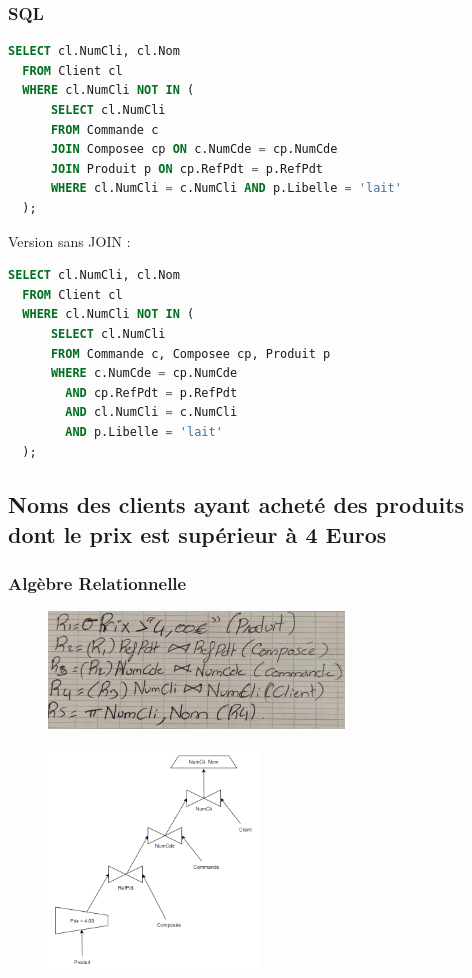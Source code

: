\documentclass{article}
\begin{document}
\subsubsection{SQL}

\begin{lstlisting}[language=SQL]
  SELECT cl.NumCli, cl.Nom 
  FROM Client cl
  WHERE cl.NumCli NOT IN (
      SELECT cl.NumCli
      FROM Commande c
      JOIN Composee cp ON c.NumCde = cp.NumCde
      JOIN Produit p ON cp.RefPdt = p.RefPdt
      WHERE cl.NumCli = c.NumCli AND p.Libelle = 'lait'
  );
\end{lstlisting}

Version sans JOIN :

\begin{lstlisting}[language=SQL]
  SELECT cl.NumCli, cl.Nom 
  FROM Client cl
  WHERE cl.NumCli NOT IN (
      SELECT cl.NumCli
      FROM Commande c, Composee cp, Produit p
      WHERE c.NumCde = cp.NumCde 
        AND cp.RefPdt = p.RefPdt 
        AND cl.NumCli = c.NumCli 
        AND p.Libelle = 'lait'
  );
\end{lstlisting}

\subsection{Noms des clients ayant acheté des produits dont le prix est supérieur à 4 Euros}

\subsubsection{Algèbre Relationnelle}

\begin{figure}[H]
  \centering
  \includegraphics[width=0.7\textwidth]{alg/9.png}
  \label{fig:alg-rel}
\end{figure}

\begin{figure}[H]
  \centering
  \includegraphics[width=0.5\textwidth]{algRel/9.png}
  \label{fig:alg-rel}
\end{figure}
\end{document}
